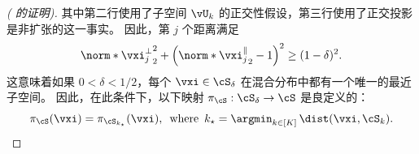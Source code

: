 \documentclass[../../book-main_zh.tex]{subfiles}
\begin{document}
\begin{proof}[( 的证明)]
    其中第二行使用了子空间 $\vU_k$ 的正交性假设，第三行使用了正交投影是非扩张的这一事实。
    因此，第 $j$ 个距离满足
    \begin{equation}
        \norm*{\vxi^{\perp}_j}_2^2
        + \left( \norm*{\vxi^{\|}_j}_2 - 1 \right)^2
        \geq
        (1 - \delta)^2.
    \end{equation}
    这意味着如果 $0 < \delta < 1/2$，每个 $\vxi \in \cS_{\delta}$ 在混合分布中都有一个唯一的最近子空间。
    因此，在此条件下，以下映射 $\pi_{\cS} : \cS_{\delta} \to \cS$ 是良定义的：
    \begin{equation}
        \pi_{\cS}(\vxi)
        =
        \pi_{\cS_{k_\star}}(\vxi),
        \enspace\text{where}\enspace
        k_{\star} = \argmin_{k \in [K]}\,
        \dist(\vxi, \cS_{k}).
    \end{equation}


\end{proof}
\end{document}
